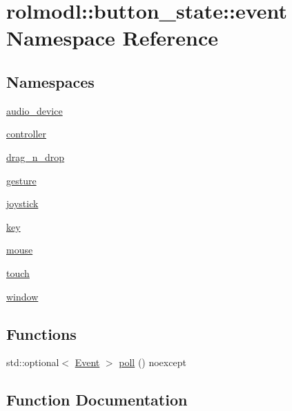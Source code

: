 \hypertarget{namespacerolmodl_1_1button__state_1_1event}{}\section{rolmodl\+::button\+\_\+state\+::event Namespace Reference}
\label{namespacerolmodl_1_1button__state_1_1event}
\subsection*{Namespaces}
\begin{DoxyCompactItemize}
\item 
 \mbox{\hyperlink{namespacerolmodl_1_1button__state_1_1event_1_1audio__device}{audio\+\_\+device}}
\item 
 \mbox{\hyperlink{namespacerolmodl_1_1button__state_1_1event_1_1controller}{controller}}
\item 
 \mbox{\hyperlink{namespacerolmodl_1_1button__state_1_1event_1_1drag__n__drop}{drag\+\_\+n\+\_\+drop}}
\item 
 \mbox{\hyperlink{namespacerolmodl_1_1button__state_1_1event_1_1gesture}{gesture}}
\item 
 \mbox{\hyperlink{namespacerolmodl_1_1button__state_1_1event_1_1joystick}{joystick}}
\item 
 \mbox{\hyperlink{namespacerolmodl_1_1button__state_1_1event_1_1key}{key}}
\item 
 \mbox{\hyperlink{namespacerolmodl_1_1button__state_1_1event_1_1mouse}{mouse}}
\item 
 \mbox{\hyperlink{namespacerolmodl_1_1button__state_1_1event_1_1touch}{touch}}
\item 
 \mbox{\hyperlink{namespacerolmodl_1_1button__state_1_1event_1_1window}{window}}
\end{DoxyCompactItemize}
\subsection*{Functions}
\begin{DoxyCompactItemize}
\item 
std\+::optional$<$ \mbox{\hyperlink{namespacerolmodl_1_1button__state_aef4672e4b037d3f04e71d731caf34aa9}{Event}} $>$ \mbox{\hyperlink{namespacerolmodl_1_1button__state_1_1event_a5696e87e4ecb5f92aab363c7180b9c64}{poll}} () noexcept
\end{DoxyCompactItemize}


\subsection{Function Documentation}
\mbox{\label{namespacerolmodl_1_1button__state_1_1event_a5696e87e4ecb5f92aab363c7180b9c64}} 
